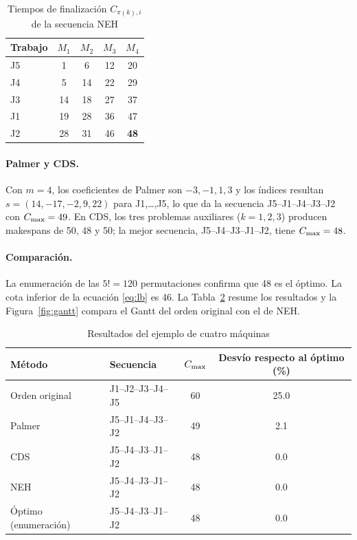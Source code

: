\begin{table}[htbp]
\caption{Tiempos de finalización $C_{\pi(k),i}$ de la secuencia NEH}\label{tab:comp}
\centering
\begin{tabular}{@{}lcccc@{}}
\toprule
Trabajo & $M_1$ & $M_2$ & $M_3$ & $M_4$ \\
\midrule
J5 & 1 & 6 & 12 & 20 \\
J4 & 5 & 14 & 22 & 29 \\
J3 & 14 & 18 & 27 & 37 \\
J1 & 19 & 28 & 36 & 47 \\
J2 & 28 & 31 & 46 & \textbf{48} \\
\bottomrule
\end{tabular}
\end{table}

\paragraph{Palmer y CDS.} Con $m=4$, los coeficientes de Palmer son $-3,-1,1,3$ y los
índices resultan $s=(14,-17,-2,9,22)$ para J1,\ldots,J5, lo que da la secuencia
J5--J1--J4--J3--J2 con $C_{\max}=49$. En CDS, los tres problemas auxiliares ($k=1,2,3$)
producen makespans de 50, 48 y 50; la mejor secuencia, J5--J4--J3--J1--J2, tiene
$C_{\max}=48$.

\paragraph{Comparación.} La enumeración de las $5!=120$ permutaciones confirma que 48 es
el óptimo. La cota inferior de la ecuación \eqref{eq:lb} es 46. La Tabla~\ref{tab:res}
resume los resultados y la Figura~\ref{fig:gantt} compara el Gantt del orden original con
el de NEH.

\begin{table}[htbp]
\caption{Resultados del ejemplo de cuatro máquinas}\label{tab:res}
\centering
\begin{tabular}{@{}llcc@{}}
\toprule
Método & Secuencia & $C_{\max}$ & Desvío respecto al óptimo (\%) \\
\midrule
Orden original & J1--J2--J3--J4--J5 & 60 & 25.0 \\
Palmer & J5--J1--J4--J3--J2 & 49 & 2.1 \\
CDS & J5--J4--J3--J1--J2 & 48 & 0.0 \\
NEH & J5--J4--J3--J1--J2 & 48 & 0.0 \\
Óptimo (enumeración) & J5--J4--J3--J1--J2 & 48 & 0.0 \\
\bottomrule
\end{tabular}
\end{table}

